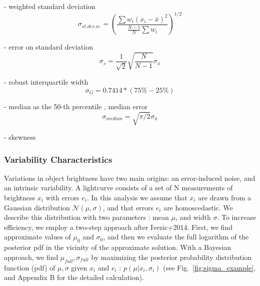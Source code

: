 \documentclass[fleqn,usenatbib]{mnras}  %
\begin{document}
- weighted standard deviation 
\begin{equation}
\sigma_{st.dev.w.} = \left( \frac{\sum{w_{i}(x_{i} - \bar{x})^{2}}}{\frac{N-1}{N}\sum{w_{i}}} \right) ^ {1/2}
\end{equation}

- error on standard deviation 
\begin{equation}
\sigma_{s} = \frac{1}{\sqrt{2}}\sqrt{\frac{N}{N-1}} \sigma_{\bar{x}}
\end{equation}

- robust interquartile width
\begin{equation}
\sigma_{G} = 0.7414 * (75\% - 25\%) 
\end{equation}

- median as the 50-th percentile , median error 
\begin{equation}
\sigma_{median} = \sqrt{\pi/2}\sigma_{\bar{x}}
\end{equation}
 

- skewness 






\subsubsection{Variability Characteristics}

Variations in object brightness  have two main origins:  an  error-induced noise, and an intrinsic variability. A lightcurve consists of a set of N measurements of brightness  $x_{i}$  with  errors  $e_{i}$. In this analysis we assume that  $x_{i}$ are drawn from a Gaussian distribution  $\mathcal{N}(\mu,\sigma)$, and that errors $e_{i}$ are homoscedastic. We describe this distribution with two parameters : mean $\mu$, and width $\sigma$. To increase efficiency, we employ a two-step  approach after Ivezic+2014. 
First, we find approximate values of  $\mu_{0}$ and $\sigma_{0}$, and then we evaluate the full logarithm of the posterior pdf in the vicinity of the approximate solution.
With a Bayesian approach, we find $\mu_{full},\sigma_{full}$  by maximizing  the posterior probability distribution function (pdf) of  $\mu,\sigma$ given $x_{i}$ and $e_{i}$ : $p(\mu | {x_{i}},{\sigma_{i}})$ (see Fig.~\ref{fig:sigma_example}, and Appendix B for the detailed calculation). 
\end{document}
